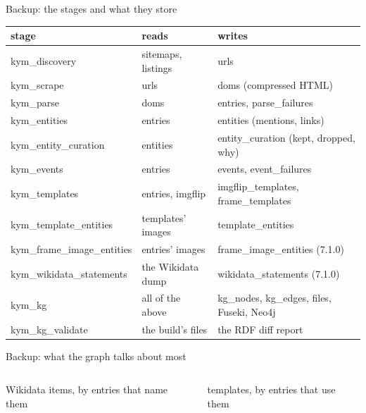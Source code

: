 \begin{frame}{Backup: the stages and what they store}
  {\normalsize
  \begin{tabular}{@{}lll@{}}
    \bfseries stage & \bfseries reads & \bfseries writes\\\midrule
    kym\_discovery & sitemaps, listings & urls\\
    kym\_scrape & urls & doms (compressed HTML)\\
    kym\_parse & doms & entries, parse\_failures\\
    kym\_entities & entries & entities (mentions, links)\\
    kym\_entity\_curation & entities & entity\_curation (kept, dropped, why)\\
    kym\_events & entries & events, event\_failures\\
    kym\_templates & entries, imgflip & imgflip\_templates, frame\_templates\\
    kym\_template\_entities & templates' images & template\_entities\\
    kym\_frame\_image\_entities & entries' images & frame\_image\_entities (7.1.0)\\
    kym\_wikidata\_statements & the Wikidata dump & wikidata\_statements (7.1.0)\\
    kym\_kg & all of the above & kg\_nodes, kg\_edges, files, Fuseki, Neo4j\\
    kym\_kg\_validate & the build's files & the RDF diff report\\
  \end{tabular}}
\end{frame}

\begin{frame}{Backup: what the graph talks about most}
  \begin{columns}[t]
      {\large\color{gmInk2}Wikidata items, by entries that name them}\par\vskip1mm
      
      {\large\color{gmInk2}templates, by entries that use them}\par\vskip1mm
      
  \end{columns}
\end{frame}

